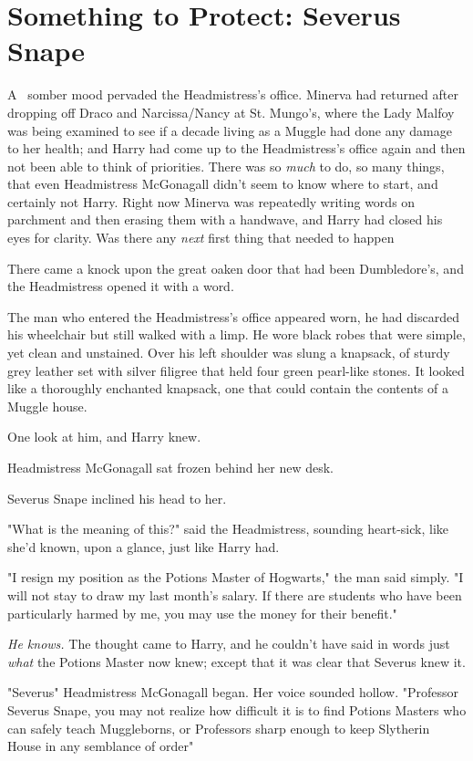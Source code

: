 \chapter{Something to Protect: Severus Snape}

\lettrine{A}{~} somber mood
pervaded the Headmistress's office. Minerva had returned after dropping off
Draco and Narcissa/Nancy at St. Mungo's, where the Lady Malfoy was being
examined to see if a decade living as a Muggle had done any damage to her
health; and Harry had come up to the Headmistress's office again and
then{\el} not been able to think of priorities. There was so \emph{much} to
do, so many things, that even Headmistress McGonagall didn't seem to know where
to start, and certainly not Harry. Right now Minerva was repeatedly writing
words on parchment and then erasing them with a handwave, and Harry had closed
his eyes for clarity. Was there any \emph{next} first thing that needed to
happen{\el}

There came a knock upon the great oaken door that had been Dumbledore's, and
the Headmistress opened it with a word.

The man who entered the Headmistress's office appeared worn, he had discarded
his wheelchair but still walked with a limp. He wore black robes that were
simple, yet clean and unstained. Over his left shoulder was slung a knapsack,
of sturdy grey leather set with silver filigree that held four green pearl-like
stones. It looked like a thoroughly enchanted knapsack, one that could contain
the contents of a Muggle house.

One look at him, and Harry knew.

Headmistress McGonagall sat frozen behind her new desk.

Severus Snape inclined his head to her.

"What is the meaning of this?" said the Headmistress, sounding{\el}
heart-sick, like she'd known, upon a glance, just like Harry had.

"I resign my position as the Potions Master of Hogwarts," the man said simply.
"I will not stay to draw my last month's salary. If there are students who have
been particularly harmed by me, you may use the money for their benefit."

\emph{He knows.} The thought came to Harry, and he couldn't have said in words
just \emph{what} the Potions Master now knew; except that it was clear that
Severus knew it.

"Severus{\el}" Headmistress McGonagall began. Her voice sounded hollow.
"Professor Severus Snape, you may not realize how difficult it is to find
Potions Masters who can safely teach Muggleborns, or Professors sharp enough to
keep Slytherin House in any semblance of order{\el}"

